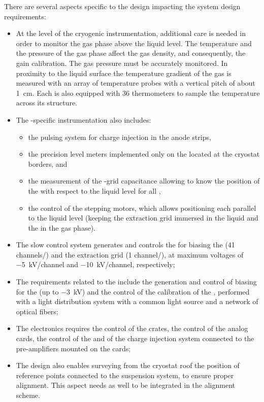 There are several aspects specific to the \dual design impacting the  system design requirements:
\begin{itemize}
\item At the level of the cryogenic instrumentation, additional care is needed in order to monitor the gas phase above the liquid level. The temperature and the pressure of the gas phase affect the gas density, and consequently, the  gain calibration. The gas pressure must be accurately monitored. In proximity to the liquid surface the temperature gradient of the gas %
is measured with an array of temperature probes with a vertical pitch of about \SI{1}{cm}. Each  is also equipped with \num{36} thermometers to sample the temperature across its structure.

\item The -specific instrumentation also includes: 

\begin{itemize}
\item the pulsing system for charge injection in the anode strips,
\item the precision level meters implemented only on the  located at the cryostat borders, and 
\item the measurement of the -grid capacitance allowing to know  the position of the  with respect to the liquid level for all , 
\item the control of the stepping motors,  which allows positioning each  parallel to the liquid level (keeping the extraction grid immersed in the liquid and the  in the gas phase).
\end{itemize}

\item The slow control system generates and controls the  for biasing the  (\num{41} channels/) and the extraction grid  (\num{1} channel/), at maximum voltages of  \SI{-5}{kV/channel} and \SI{-10}{kV/channel}, respectively;
\item The requirements related to the  include the generation and control of  biasing for the  (up to \SI{-3}{kV}) and the control of the calibration of the  ,  performed with a  light distribution system with a common light source and a network of optical fibers;
\item The  electronics requires the control of the  crates, the control of the  analog  cards, the control of the  and of the charge injection system connected to the pre-amplifiers mounted on the  cards;
\item The \dual design also enables surveying from the cryostat roof the position of reference points connected to the  suspension system, to ensure proper  alignment. This aspect needs as well to be integrated in the alignment scheme. 
\end{itemize}

